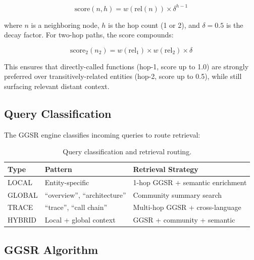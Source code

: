 \documentclass[11pt,letterpaper]{article}
\begin{document}
\begin{equation}
\label{eq:score}
\text{score}(n, h) = w(\text{rel}(n)) \times \delta^{h-1}
\end{equation}

where $n$ is a neighboring node, $h$ is the hop count (1 or 2), and
$\delta = 0.5$ is the decay factor. For two-hop paths, the score
compounds:

\begin{equation}
\label{eq:twohop}
\text{score}_2(n_2) = w(\text{rel}_1) \times w(\text{rel}_2) \times \delta
\end{equation}

This ensures that directly-called functions (hop-1, score up to 1.0)
are strongly preferred over transitively-related entities (hop-2,
score up to 0.5), while still surfacing relevant distant context.

\subsection{Query Classification}

The GGSR engine classifies incoming queries to route retrieval:

\begin{table}[H]
\centering
\caption{Query classification and retrieval routing.}
\label{tab:queryclass}
\begin{tabular}{@{}llp{5cm}@{}}
\toprule
\textbf{Type} & \textbf{Pattern} & \textbf{Retrieval Strategy} \\
\midrule
LOCAL   & Entity-specific & 1-hop GGSR + semantic enrichment \\
GLOBAL  & ``overview'', ``architecture'' & Community summary search \\
TRACE   & ``trace'', ``call chain'' & Multi-hop GGSR + cross-language \\
HYBRID  & Local + global context & GGSR + community + semantic \\
\bottomrule
\end{tabular}
\end{table}

\subsection{GGSR Algorithm}
\end{document}
